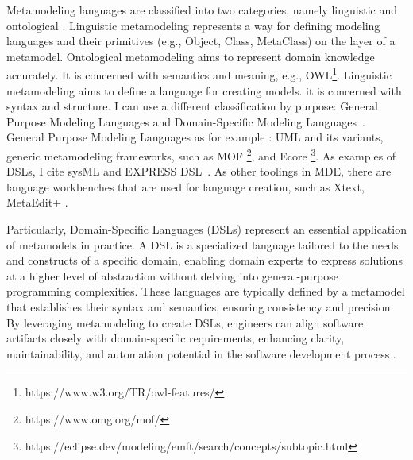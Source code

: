  




Metamodeling languages are classified into two categories, namely linguistic and ontological \cite{gavsevic2007metamodeling}. Linguistic metamodeling represents a way for defining modeling languages and their primitives (e.g., Object, Class, MetaClass) on the layer of a metamodel. Ontological metamodeling aims to represent domain knowledge accurately. It is concerned with semantics and meaning, e.g., OWL\footnote{https://www.w3.org/TR/owl-features/}. Linguistic metamodeling aims to define a language for creating models. it is concerned with syntax and structure.
I can use a different classification by purpose: General Purpose Modeling Languages and Domain-Specific Modeling Languages~\cite{de2012domain}. General Purpose Modeling Languages as for example : UML and its variants, generic metamodeling frameworks, such as MOF \footnote{https://www.omg.org/mof/}, and Ecore \footnote{https://eclipse.dev/modeling/emft/search/concepts/subtopic.html}. As examples of DSLs, I cite sysML and EXPRESS DSL~\cite{wortmann2020modeling}. As other toolings in MDE, there are language workbenches that are used for language creation, such as Xtext, MetaEdit+ \cite{wortmann2020modeling}.

Particularly, Domain-Specific Languages (DSLs) represent an essential application of metamodels in practice. A DSL is a specialized language tailored to the needs and constructs of a specific domain, enabling domain experts to express solutions at a higher level of abstraction without delving into general-purpose programming complexities. These languages are typically defined by a metamodel that establishes their syntax and semantics, ensuring consistency and precision. By leveraging metamodeling to create DSLs, engineers can align software artifacts closely with domain-specific requirements, enhancing clarity, maintainability, and automation potential in the software development process \cite{volter2013model}.

